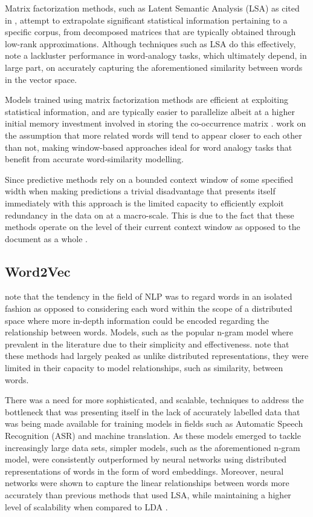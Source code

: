 \documentclass[../../fyp.tex]{subfiles}
\begin{document}
\cite{mikolov2013b} Matrix factorization methods, such as Latent Semantic Analysis (LSA) \cite{deerwester1990} as cited in \cite{pennington}, attempt to extrapolate significant statistical information pertaining to a specific corpus, from decomposed matrices that are typically obtained through low-rank approximations. Although techniques such as LSA do this effectively, \cite{pennington} note a lackluster performance in word-analogy tasks, which ultimately depend, in large part, on accurately capturing the aforementioned similarity between words in the vector space.

Models trained using matrix factorization methods are efficient at exploiting statistical information, and are typically easier to parallelize albeit at a higher initial memory investment involved in storing the co-occurrence matrix \cite{pennington}. \cite{mikolov2013} work on the assumption that more related words will tend to appear closer to each other than not, making window-based approaches ideal for word analogy tasks that benefit from accurate word-similarity modelling.

Since predictive methods rely on a bounded context window of some specified width when making predictions a trivial disadvantage that presents itself immediately with this approach is the limited capacity to efficiently exploit redundancy in the data on at a macro-scale. This is due to the fact that these methods operate on the level of their current context window as opposed to the document as a whole \cite{pennington}.

\subsection{Word2Vec}
\cite{mikolov2013} note that the tendency in the field of NLP was to regard words in an isolated fashion as opposed to considering each word within the scope of a distributed space where more in-depth information could be encoded regarding the relationship between words. Models, such as the popular n-gram model where prevalent in the literature due to their simplicity and effectiveness. \cite{mikolov2013b} note that these methods had largely peaked as unlike distributed representations, they were limited in their capacity to model relationships, such as similarity, between words.

There was a need for more sophisticated, and scalable, techniques to address the bottleneck that was presenting itself in the lack of accurately labelled data that was being made available for training models in fields such as Automatic Speech Recognition (ASR) and machine translation. As these models emerged to tackle increasingly large data sets, simpler models, such as the aforementioned n-gram model, were consistently outperformed by neural networks using distributed representations of words in the form of word embeddings. Moreover, neural networks were shown to capture the linear relationships between words more accurately than previous methods that used LSA, while maintaining a higher level of scalability when compared to LDA \cite{mikolov2013}.
\end{document}
